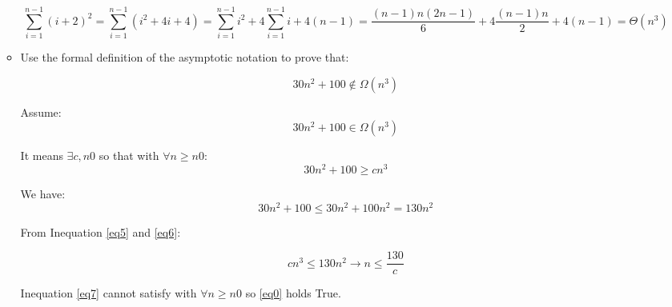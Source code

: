 \documentclass[[11pts]{report}
\begin{document}
\begin{enumerate}
\begin{itemize}
\begin{equation*}
\sum_{i=1}^{n-1}(i+2)^2 = \sum_{i=1}^{n-1}{(i^2 + 4i + 4)} = \sum_{i=1}^{n-1}i^2 + 4\sum_{i=1}^{n-1}i + 4(n-1) = \frac{(n-1)n(2n-1)}{6} + 4\frac{(n-1)n}{2} + 4(n-1) = \Theta(n^3)
\end{equation*}

\item Use the formal definition of the asymptotic notation to prove that:

\begin{equation}
30n^2 + 100 \notin \Omega(n^3)
\label{eq0}
\end{equation}

Assume: 
\begin{equation*}
30n^2 + 100 \in \Omega(n^3)
\end{equation*}

It means $\exists c, n0$ so that with $\forall n \geq n0$:
\begin{equation}
30n^2 + 100 \geq cn^3
\label{eq5}
\end{equation}

We have:
\begin{equation}
30n^2 + 100 \leq 30n^2 + 100n^2 = 130n^2
\label{eq6}
\end{equation}

From Inequation \ref{eq5} and \ref{eq6}:

\begin{equation}
cn^3 \leq 130n^2 \to n \leq \frac{130}{c}
\label{eq7}
\end{equation}

Inequation \ref{eq7} cannot satisfy with $\forall n \geq n0$ so \ref{eq0} holds True.

\end{itemize}

\end{enumerate}
\end{document}
